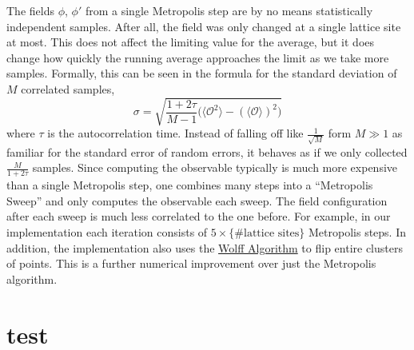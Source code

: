 \documentclass[12pt]{article}
\begin{document}
The fields $\phi$, $\phi'$ from a single Metropolis step are by no
means statistically independent samples. After all, the field was only
changed at a single lattice site at most. This does not affect the
limiting value for the average, but it does change how quickly the
running average approaches the limit as we take more
samples. Formally, this can be seen in the formula for the standard
deviation of $M$ correlated samples,
\begin{equation}
  \sigma = 
  \sqrt{
    \frac{1+2\tau}{M-1}
    \Big( \langle\mathcal{O}^2\rangle 
    - (\langle\mathcal{O}\rangle)^2 \Big)
  }
\end{equation}
where $\tau$ is the autocorrelation time. Instead of falling off like
$\frac{1}{\sqrt{M}}$ form $M\gg1$ as familiar for the standard error
of random errors, it behaves as if we only collected
$\frac{M}{1+2\tau}$ samples. Since computing the observable typically
is much more expensive than a single Metropolis step, one combines
many steps into a ``Metropolis Sweep'' and only computes the
observable each sweep. The field configuration after each sweep is
much less correlated to the one before. For example, in our
implementation each iteration consists of $5 \times \{\text{\# lattice
  sites}\}$ Metropolis steps. In addition, the implementation also
uses the \href{http://en.wikipedia.org/wiki/Wolff_algorithm}{Wolff
  Algorithm} to flip entire clusters of points. This is a further
numerical improvement over just the Metropolis algorithm. 







\newpage
\appendix

\section{test}



 
\renewcommand{\refname}{Bibliography}

\end{document}
